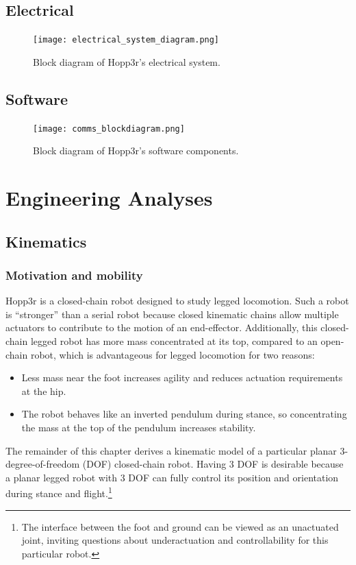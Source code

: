 \documentclass{report}
\begin{document}
\section[Electrical]{Electrical}

\begin{figure}[H]
	\centering
	\texttt{[image: electrical\_system\_diagram.png]}
	\caption{Block diagram of Hopp3r's electrical system.}
	\label{fig:electrical_system_diagram}
\end{figure}

\section[Software]{Software}

\begin{figure}[H]
	\centering
	\texttt{[image: comms\_blockdiagram.png]}
	\caption{Block diagram of Hopp3r's software components.}
	\label{fig:comms_blockdiagram}
\end{figure}

\chapter[Engineering Analyses]{Engineering Analyses}
\section[Kinematics]{Kinematics}
\subsection[Motivation and mobility]{Motivation and mobility}
Hopp3r is a closed-chain robot designed to study legged locomotion. Such a robot is ``stronger'' than a serial robot because closed kinematic chains allow multiple actuators to contribute to the motion of an end-effector. Additionally, this closed-chain legged robot has more mass concentrated at its top, compared to an open-chain robot, which is advantageous for legged locomotion for two reasons:
\begin{itemize}
	\item Less mass near the foot increases agility and reduces actuation requirements at the hip.
	\item The robot behaves like an inverted pendulum during stance, so concentrating the mass at the top of the pendulum increases stability.
\end{itemize}

The remainder of this chapter derives a kinematic model of a particular planar 3-degree-of-freedom (DOF) closed-chain robot. Having 3 DOF is desirable because a planar legged robot with 3 DOF can fully control its position and orientation during stance and flight.\footnote{The interface between the foot and ground can be viewed as an unactuated joint, inviting questions about underactuation and controllability for this particular robot.}
\end{document}
